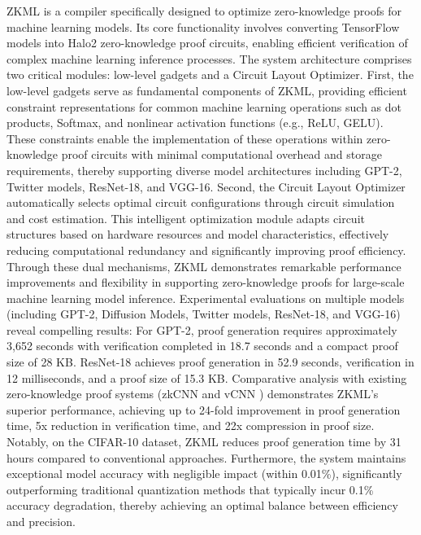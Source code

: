 \documentclass[journal]{IEEEtran}
\begin{document}
ZKML \cite{chen2024zkml} is a compiler specifically designed to optimize zero-knowledge proofs for machine learning models. Its core functionality involves converting TensorFlow models into Halo2 zero-knowledge proof circuits, enabling efficient verification of complex machine learning inference processes. The system architecture comprises two critical modules: low-level gadgets and a Circuit Layout Optimizer. First, the low-level gadgets serve as fundamental components of ZKML, providing efficient constraint representations for common machine learning operations such as dot products, Softmax, and nonlinear activation functions (e.g., ReLU, GELU). These constraints enable the implementation of these operations within zero-knowledge proof circuits with minimal computational overhead and storage requirements, thereby supporting diverse model architectures including GPT-2, Twitter models, ResNet-18, and VGG-16. Second, the Circuit Layout Optimizer automatically selects optimal circuit configurations through circuit simulation and cost estimation. This intelligent optimization module adapts circuit structures based on hardware resources and model characteristics, effectively reducing computational redundancy and significantly improving proof efficiency. Through these dual mechanisms, ZKML demonstrates remarkable performance improvements and flexibility in supporting zero-knowledge proofs for large-scale machine learning model inference. Experimental evaluations on multiple models (including GPT-2, Diffusion Models, Twitter models, ResNet-18, and VGG-16) reveal compelling results: For GPT-2, proof generation requires approximately 3,652 seconds with verification completed in 18.7 seconds and a compact proof size of 28 KB. ResNet-18 achieves proof generation in 52.9 seconds, verification in 12 milliseconds, and a proof size of 15.3 KB. Comparative analysis with existing zero-knowledge proof systems (zkCNN \cite{liu2021zkcnn} and vCNN \cite{lee2024vcnn}) demonstrates ZKML's superior performance, achieving up to 24-fold improvement in proof generation time, 5x reduction in verification time, and 22x compression in proof size. Notably, on the CIFAR-10 dataset, ZKML reduces proof generation time by 31 hours compared to conventional approaches. Furthermore, the system maintains exceptional model accuracy with negligible impact (within 0.01\%), significantly outperforming traditional quantization methods that typically incur 0.1\% accuracy degradation, thereby achieving an optimal balance between efficiency and precision.
\end{document}
